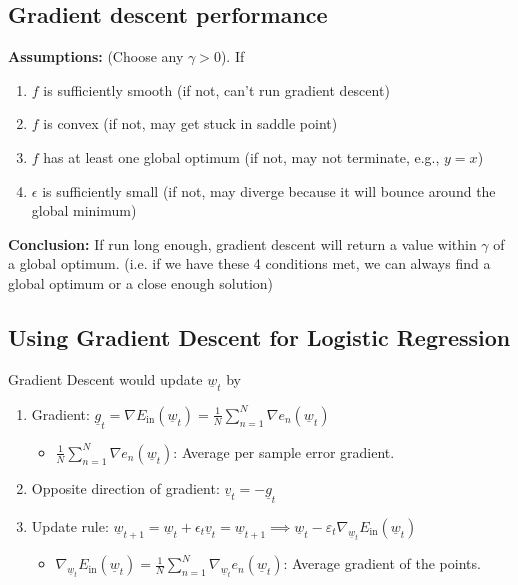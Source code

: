 \subsection{Gradient descent performance}
\begin{theorem}

    \textbf{Assumptions:} (Choose any $\gamma > 0$). If
    \begin{enumerate}
        \item $f$ is sufficiently smooth (if not, can't run gradient descent)
        \item $f$ is convex (if not, may get stuck in saddle point)
        \item $f$ has at least one global optimum (if not, may not terminate, e.g., $y=x$)
        \item $\epsilon$ is sufficiently small (if not, may diverge because it will bounce around the global minimum)
    \end{enumerate}

    \textbf{Conclusion:} If run long enough, gradient descent will return a value within $\gamma$ of a global optimum. (i.e. if we have these 4 conditions met, we can always find a global optimum or a close enough solution)

\end{theorem}

\subsection{Using Gradient Descent for Logistic Regression}
\begin{definition}
    Gradient Descent would update \( \underline{w}_t \) by
    \begin{enumerate}
        \item Gradient: $\underline{g}_t = \nabla E_{\text{in}}(\underline{w}_t) = \frac{1}{N} \sum_{n=1}^{N} \nabla e_n(\underline{w}_t)$
        \begin{itemize}
            \item  \( \frac{1}{N} \sum_{n=1}^{N} \nabla e_n(\underline{w}_t) \): Average per sample error gradient.
        \end{itemize}
        \item Opposite direction of gradient: $\underline{v}_t = - \underline{g}_t$
        \item Update rule: $\underline{w}_{t+1} = \underline{w}_t + \epsilon_t \underline{v}_t = \underline{w}_{t+1} \implies \underline{w}_t - \varepsilon_t \nabla_{\underline{w}_t} E_{\text{in}}(\underline{w}_t)$
        \begin{itemize}
            \item  $\nabla_{\underline{w}_t} E_{\text{in}}(\underline{w}_t) = \frac{1}{N} \sum_{n=1}^{N} \nabla_{\underline{w}_t} e_n(\underline{w}_t)$: Average gradient of the points.
        \end{itemize}
    \end{enumerate}
\end{definition}

